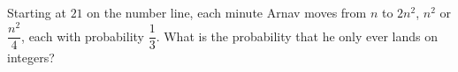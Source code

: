 Starting at $21$ on the number line, each minute Arnav moves from $n$ to $2n^2$, $n^2$ or $\dfrac{n^2}4$, each with probability $\dfrac13$. What is the probability that he only ever lands on integers?
